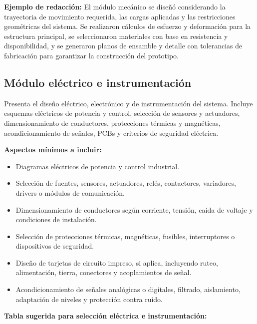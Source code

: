 \documentclass[12pt,letterpaper]{report}
\begin{document}
\begin{instrucciones}
\noindent \textbf{Ejemplo de redacción:} El módulo mecánico se diseñó considerando la trayectoria de movimiento requerida, las cargas aplicadas y las restricciones geométricas del sistema. Se realizaron cálculos de esfuerzo y deformación para la estructura principal, se seleccionaron materiales con base en resistencia y disponibilidad, y se generaron planos de ensamble y detalle con tolerancias de fabricación para garantizar la construcción del prototipo.
\end{instrucciones}

\subsection{Módulo eléctrico e instrumentación}

\begin{instrucciones}
Presenta el diseño eléctrico, electrónico y de instrumentación del sistema. Incluye esquemas eléctricos de potencia y control, selección de sensores y actuadores, dimensionamiento de conductores, protecciones térmicas y magnéticas, acondicionamiento de señales, PCBs y criterios de seguridad eléctrica.

\vspace{2mm}
\noindent \textbf{Aspectos mínimos a incluir:}
\begin{itemize}
  \item Diagramas eléctricos de potencia y control industrial.
  \item Selección de fuentes, sensores, actuadores, relés, contactores, variadores, drivers o módulos de comunicación.
  \item Dimensionamiento de conductores según corriente, tensión, caída de voltaje y condiciones de instalación.
  \item Selección de protecciones térmicas, magnéticas, fusibles, interruptores o dispositivos de seguridad.
  \item Diseño de tarjetas de circuito impreso, si aplica, incluyendo ruteo, alimentación, tierra, conectores y acoplamientos de señal.
  \item Acondicionamiento de señales analógicas o digitales, filtrado, aislamiento, adaptación de niveles y protección contra ruido.
\end{itemize}

\vspace{2mm}
\noindent \textbf{Tabla sugerida para selección eléctrica e instrumentación:}


\end{instrucciones}
\end{document}
